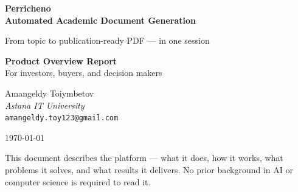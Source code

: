 \documentclass[12pt, a4paper]{article}
\begin{document}
\begin{titlepage}
  \centering
  \vspace*{1.5cm}
  {\LARGE\bfseries\color{C1}
    Perricheno\\[0.4em]
    Automated Academic Document Generation\par}
  \vspace{1.0em}
  {\large\color{MG} From topic to publication-ready PDF — in one session\par}
  \vspace{2em}
  \begin{tcolorbox}[colback=L1, colframe=C1, arc=6pt, boxrule=1.6pt,
                    width=10cm, halign=center]
    \centering
    {\large\bfseries\color{C1} Product Overview Report}\\[0.4em]
    {\normalsize For investors, buyers, and decision makers}
  \end{tcolorbox}
  \vspace{2em}
  {\large
    Amangeldy Toiymbetov\\[0.3em]
    \textit{Astana IT University}\\[0.2em]
    \texttt{amangeldy.toy123@gmail.com}\par}
  \vspace{1.5em}
  {\large\today\par}
  \vfill
  {\small\color{MG}
    This document describes the \sys{} platform — what it does, how it works,
    what problems it solves, and what results it delivers.
    No prior background in AI or computer science is required to read it.\par}
\end{titlepage}

\tableofcontents
\newpage


\newpage


\newpage

\newpage

\newpage

\newpage

\newpage

\newpage

\newpage


\newpage
\printbibliography[heading=bibintoc, title={References}]
\end{document}
